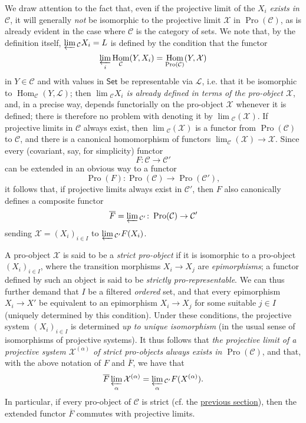 \documentclass{article}
\theoremstyle{plain}
\theoremstyle{definition}
\newcommand{\cat}[1]{{\mathcal{#1}}}
\newcommand{\Set}{\mathsf{Set}}
\DeclareMathOperator{\Hom}{Hom}
\DeclareMathOperator{\Pro}{Pro}
\newcommand{\oldpage}[1]{\marginpar{\footnotesize$\Big\vert$ \textit{p.~#1}}}
\begin{document}
We draw attention to the fact that, even if the projective limit of the $X_i$ \emph{exists in $\cat{C}$}, it will generally \emph{not} be isomorphic to the projective limit $\cat{X}$ in $\Pro(\cat{C})$, as is already evident in the case where $\cat{C}$ is the category of sets.
We note that, by the definition itself, $\varprojlim{}_{\cat{C}}X_i=L$ is defined by the condition that the functor
\[
  \varprojlim_i\Hom_{\cat{C}}(Y,X_i)=\Hom_{\Pro(\cat{C})}(Y,\cat{X})
\]
in $Y\in\cat{C}$ and with values in $\Set$ be representable via $\cat{L}$, i.e. that it be isomorphic to $\Hom_{\cat{C}}(Y,\cat{L})$;
then \emph{$\lim{}_{\cat{C}}X_i$ is already defined in terms of the \emph{pro-object} $\cat{X}$}, and, in a precise way, depends functorially on the pro-object $\cat{X}$ whenever it is defined;
there is therefore no problem with denoting it by $\lim{}_{\cat{C}}(\cat{X})$.
If projective limits in $\cat{C}$ always exist, then $\lim{}_{\cat{C}}(\cat{X})$ is a functor from $\Pro(\cat{C})$ to $\cat{C}$, and there is a canonical homomorphism of functors $\lim_\cat{C}(\cat{X})\to\cat{X}$.
Since every (covariant, say, for simplicity) functor
\[
  F\colon \cat{C} \to \cat{C}'
\]
can be extended in an obvious way to a functor
\[
  \Pro(F)\colon \Pro(\cat{C}) \to \Pro(\cat{C}'),
\]
it follows that, if projective limits always exist in $\cat{C}'$, then $F$ also canonically defines a composite functor
\[
  \overline{F} = \varprojlim{}_{\cat{C}'}\colon \Pro(\cat{C}) \to \cat{C}'
\]
sending $\cat{X}=(X_i)_{i\in I}$ to $\varprojlim{}_{\cat{C}'}F(X_i)$.

A pro-object $\cat{X}$ is said to be a \emph{strict pro-object} if it is isomorphic to a pro-object $(X_i)_{i\in I}$, where the transition morphisms $X_i\to X_j$ are \emph{epimorphisms};
a functor defined by such an object is said to be \emph{strictly pro-representable}.
We can thus further demand that $I$ be a filtered \emph{ordered} set, and that every epimorphism
\oldpage{195-05}
$X_i\to X'$ be equivalent to an epimorphism $X_i\to X_j$ for some suitable $j\in I$ (uniquely determined by this condition).
Under these conditions, the projective system $(X_i)_{i\in I}$ is determined \emph{up to unique isomorphism} (in the usual sense of isomorphisms of projective systems).
It thus follows that \emph{the projective limit of a projective system $\cat{X}^{(\alpha)}$ of strict pro-objects always exists in $\Pro(\cat{C})$}, and that, with the above notation of $F$ and $\overline{F}$, we have that
\[
  \overline{F}\varprojlim_\alpha\cat{X}^{(\alpha)} = \varprojlim_\alpha{}_{\cat{C}'}F(X^{(\alpha)}).
\]
In particular, if every pro-object of $\cat{C}$ is strict (cf. the \hyperref[A.1]{previous section}), then the extended functor $\overline{F}$ commutes with projective limits.
\end{document}

